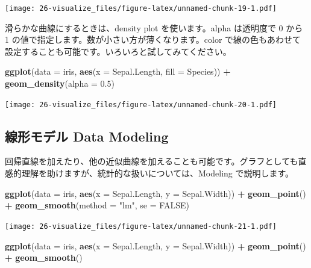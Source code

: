 \documentclass[
  xelatex, ja=standard]{bxjsbook}
\newenvironment{Shaded}{\begin{snugshade}}{\end{snugshade}}
\newcommand{\AttributeTok}[1]{\textcolor[rgb]{0.13,0.29,0.53}{#1}}
\newcommand{\ConstantTok}[1]{\textcolor[rgb]{0.56,0.35,0.01}{#1}}
\newcommand{\FloatTok}[1]{\textcolor[rgb]{0.00,0.00,0.81}{#1}}
\newcommand{\FunctionTok}[1]{\textcolor[rgb]{0.13,0.29,0.53}{\textbf{#1}}}
\newcommand{\NormalTok}[1]{#1}
\newcommand{\SpecialCharTok}[1]{\textcolor[rgb]{0.81,0.36,0.00}{\textbf{#1}}}
\newcommand{\StringTok}[1]{\textcolor[rgb]{0.31,0.60,0.02}{#1}}
\theoremstyle{definition}
\theoremstyle{definition}
\theoremstyle{definition}
\theoremstyle{definition}
\theoremstyle{remark}
\begin{document}
\texttt{[image: 26-visualize\_files/figure-latex/unnamed-chunk-19-1.pdf]}

滑らかな曲線にするときは、density plot を使います。alpha は透明度で 0 から 1 の値で指定します。数が小さい方が薄くなります。color で線の色もあわせて設定することも可能です。いろいろと試してみてください。

\begin{Shaded}
\begin{Highlighting}[]
\FunctionTok{ggplot}\NormalTok{(}\AttributeTok{data =}\NormalTok{ iris, }\FunctionTok{aes}\NormalTok{(}\AttributeTok{x =}\NormalTok{ Sepal.Length, }\AttributeTok{fill =}\NormalTok{ Species)) }\SpecialCharTok{+}
  \FunctionTok{geom\_density}\NormalTok{(}\AttributeTok{alpha =} \FloatTok{0.5}\NormalTok{)}
\end{Highlighting}
\end{Shaded}

\texttt{[image: 26-visualize\_files/figure-latex/unnamed-chunk-20-1.pdf]}

\hypertarget{ux7ddaux5f62ux30e2ux30c7ux30eb-data-modeling}{%
\subsection{線形モデル Data Modeling}\label{ux7ddaux5f62ux30e2ux30c7ux30eb-data-modeling}}

回帰直線を加えたり、他の近似曲線を加えることも可能です。グラフとしても直感的理解を助けますが、統計的な扱いについては、Modeling で説明します。

\begin{Shaded}
\begin{Highlighting}[]
\FunctionTok{ggplot}\NormalTok{(}\AttributeTok{data =}\NormalTok{ iris, }\FunctionTok{aes}\NormalTok{(}\AttributeTok{x =}\NormalTok{ Sepal.Length, }\AttributeTok{y =}\NormalTok{ Sepal.Width)) }\SpecialCharTok{+}
  \FunctionTok{geom\_point}\NormalTok{() }\SpecialCharTok{+}
  \FunctionTok{geom\_smooth}\NormalTok{(}\AttributeTok{method =} \StringTok{"lm"}\NormalTok{, }\AttributeTok{se =} \ConstantTok{FALSE}\NormalTok{)}
\end{Highlighting}
\end{Shaded}

\texttt{[image: 26-visualize\_files/figure-latex/unnamed-chunk-21-1.pdf]}

\begin{Shaded}
\begin{Highlighting}[]
\FunctionTok{ggplot}\NormalTok{(}\AttributeTok{data =}\NormalTok{ iris, }\FunctionTok{aes}\NormalTok{(}\AttributeTok{x =}\NormalTok{ Sepal.Length, }\AttributeTok{y =}\NormalTok{ Sepal.Width)) }\SpecialCharTok{+}
  \FunctionTok{geom\_point}\NormalTok{() }\SpecialCharTok{+}
  \FunctionTok{geom\_smooth}\NormalTok{()}
\end{Highlighting}
\end{Shaded}
\end{document}
